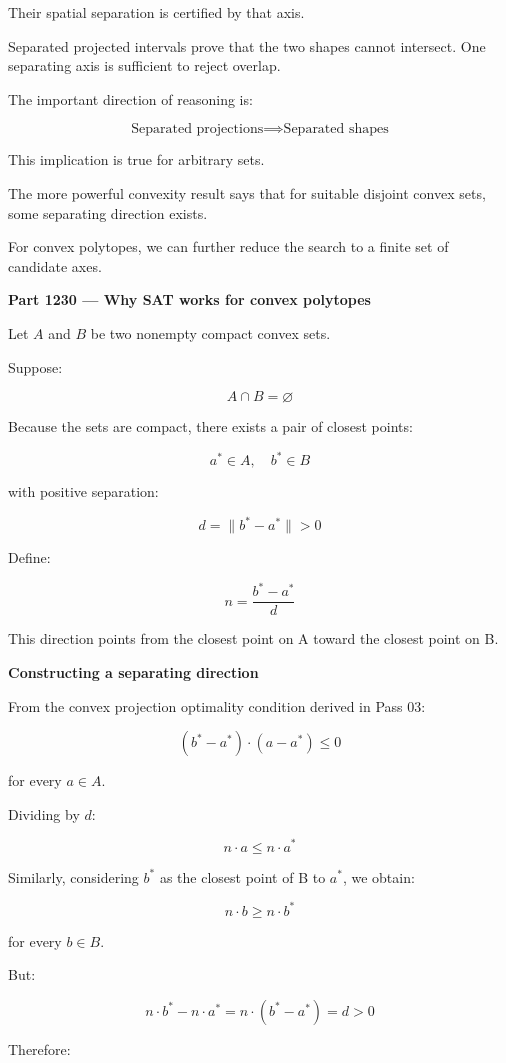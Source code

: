Their spatial separation is certified by that axis.

Separated projected intervals prove that the two shapes cannot intersect. One separating axis is sufficient to reject overlap.

The important direction of reasoning is:

\[
\boxed{ \text{Separated projections} \implies \text{Separated shapes} }
\]

This implication is true for arbitrary sets.

The more powerful convexity result says that for suitable disjoint convex sets, some separating direction exists.

For convex polytopes, we can further reduce the search to a finite set of candidate axes.

\textbf{Part 1230 --- Why SAT works for convex polytopes}

Let \(A\) and \(B\) be two nonempty compact convex sets.

Suppose:

\[
A\cap B=\varnothing
\]

Because the sets are compact, there exists a pair of closest points:

\[
a^*\in A,\quad b^*\in B
\]

with positive separation:

\[
d=\|b^*-a^*\|>0
\]

Define:

\[
\boxed{ n=\frac{b^*-a^*}{d} }
\]

This direction points from the closest point on A toward the closest point on B.

\textbf{Constructing a separating direction}

From the convex projection optimality condition derived in Pass 03:

\[
(b^*-a^*)\cdot(a-a^*)\le0
\]

for every \(a\in A\).

Dividing by \(d\):

\[
n\cdot a\le n\cdot a^*
\]

Similarly, considering \(b^*\) as the closest point of B to \(a^*\), we obtain:

\[
n\cdot b\ge n\cdot b^*
\]

for every \(b\in B\).

But:

\[
n\cdot b^*-n\cdot a^* = n\cdot(b^*-a^*)=d>0
\]

Therefore:

